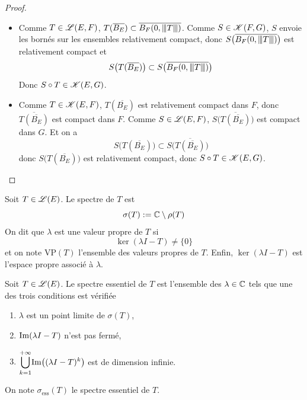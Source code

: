 \begin{proof}
    \begin{itemize}
        \item Comme $T \in \mathscr{L}(E,F)$, $T(\overline{B_E}) \subset \overline{B_F(0,{\left\vert\kern-0.25ex\left\vert \kern-0.25ex\left\vert T \right\vert\kern-0.25ex\right\vert\kern-0.25ex\right\vert})}$. Comme $S \in \mathscr{K}(F,G)$, $S$ envoie les bornés sur les ensembles relativement compact, donc $S\big(\overline{B_F(0,{\left\vert\kern-0.25ex\left\vert \kern-0.25ex\left\vert T \right\vert\kern-0.25ex\right\vert\kern-0.25ex\right\vert})}\big)$ est relativement compact et
        \begin{equation*}
            S\big(T(\overline{B_E})\big) \subset S\big(\overline{B_F(0,{\left\vert\kern-0.25ex\left\vert \kern-0.25ex\left\vert T \right\vert\kern-0.25ex\right\vert\kern-0.25ex\right\vert})}\big)
        \end{equation*}
        Donc $S \circ T \in \mathscr{K}(E,G)$.
        \item Comme $T \in \mathscr{K}(E,F)$, $T(\overline{B_E})$ est relativement compact dans $F$, donc $\overline{T(\overline{B_E})}$ est compact dans $F$. Comme $S \in \mathscr{L}(E,F)$, $S\big( \overline{T(\overline{B_E})}\big)$ est compact dans $G$. Et on a 
        \begin{equation*}
            S\big(T(\overline{B_E})\big) \subset S\big( \overline{T(\overline{B_E})}\big)
        \end{equation*}
        donc $S\big(T(\overline{B_E})\big)$ est relativement compact, donc $S \circ T \in \mathscr{K}(E,G)$.
    \end{itemize}
\end{proof}

\begin{definition}
    Soit $T \in \mathscr{L}(E)$. Le \textcolor{astral}{spectre de $T$} est 
    \begin{equation*}
        \sigma(T) := \mathbb{C} \setminus \rho(T)
    \end{equation*}
    On dit que $\lambda$ est une \textcolor{astral}{valeur propre de $T$} si 
    \begin{equation*}
        \ker (\lambda I - T) \neq \{0\}
    \end{equation*}
    et on note $\mathrm{VP}(T)$ l'ensemble des valeurs propres de $T$. Enfin, $\ker(\lambda I-T)$ est \textcolor{astral}{l'espace propre} associé à $\lambda$.
\end{definition}

\begin{definition}
    Soit $T \in \mathscr{L}(E)$. Le \textcolor{astral}{spectre essentiel de $T$} est l'ensemble des $\lambda \in \mathbb{C}$ tels que une des trois conditions est vérifiée 
    \begin{enumerate}
        \item $\lambda$ est un point limite de $\sigma(T)$,
        \item $\mathrm{Im}(\lambda I - T)$ n'est pas fermé,
        \item $\displaystyle{\bigcup_{k=1}^{+\infty}} \mathrm{Im}\big((\lambda I - T)^k\big)$ est de dimension infinie.
    \end{enumerate}
    On note $\sigma_{\text{ess}}(T)$ le spectre essentiel de $T$.
\end{definition}

